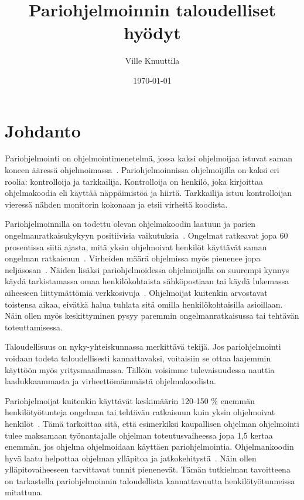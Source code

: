 \documentclass[finnish]{tktltiki2}
\title{Pariohjelmoinnin taloudelliset hyödyt}
\author{Ville Knuuttila}
\date{\today}
\theoremstyle{definition}
\theoremstyle{remark}
\begin{document}

\maketitle        %
\makeabstract     %

\tableofcontents  %
\newpage          %



\section{Johdanto}

Pariohjelmointi on ohjelmointimenetelmä, jossa kaksi ohjelmoijaa istuvat saman koneen ääressä ohjelmoimassa~\cite{pairprogramming2}. Pariohjelmoinnissa ohjelmoijilla on kaksi eri roolia: kontrolloija ja tarkkailija. Kontrolloija on henkilö, joka kirjoittaa ohjelmakoodia eli käyttää näppäimistöä ja hiirtä. Tarkkailija istuu kontrolloijan vieressä nähden monitorin kokonaan ja etsii virheitä koodista. 


Pariohjelmoinnilla on todettu olevan ohjelmakoodin laatuun ja parien ongelmanratkaisukykyyn positiivisia vaikutuksia~\cite{pairprogramming}. Ongelmat ratkeavat jopa 60 prosentissa siitä ajasta, mitä yksin ohjelmoivat henkilöt käyttävät saman ongelman ratkaisuun~\cite{meta}. Virheiden määrä ohjelmissa myös pienenee jopa neljäsosan~\cite{williams00str}. Näiden lisäksi pariohjelmoidessa ohjelmoijalla on suurempi kynnys käydä tarkistamassa omaa henkilökohtaista sähköpostiaan tai käydä lukemassa aiheeseen liittymättömiä verkkosivuja~\cite{williams03pair}. Ohjelmoijat kuitenkin arvostavat toistensa aikaa, eivätkä halua tuhlata sitä omilla henkilökohtaisilla asioillaan. Näin ollen myös keskittyminen pysyy paremmin ongelmanratkaisussa tai tehtävän toteuttamisessa.

Taloudellisuus on nyky-yhteiskunnassa merkittävä tekijä. Jos pariohjelmointi voidaan todeta taloudellisesti kannattavaksi, voitaisiin se ottaa laajemmin käyttöön myös yritysmaailmassa. Tällöin voisimme tulevaisuudessa nauttia laadukkaammasta ja virheettömämmästä ohjelmakoodista.

Pariohjelmoijat kuitenkin käyttävät keskimäärin 120-150 \% enemmän henkilötyötunteja ongelman tai tehtävän ratkaisuun kuin yksin ohjelmoivat henkilöt~\cite{williams01support}. Tämä tarkoittaa sitä, että esimerkiksi kaupallisen ohjelman ohjelmointi tulee maksamaan työnantajalle ohjelman toteutusvaiheessa jopa 1,5 kertaa enemmän, jos ohjelma ohjelmoidaan käyttäen pariohjelmointia. Ohjelmankoodin hyvä laatu helpottaa ohjelman ylläpitoa ja jatkokehitystä~\cite{pearse95maintainability}. Näin ollen ylläpitovaiheeseen tarvittavat tunnit pienenevät. Tämän tutkielman tavoitteena on tarkastella pariohjelmoinnin taloudellista kannattavuutta henkilötyötunneissa mitattuna.
\end{document}
